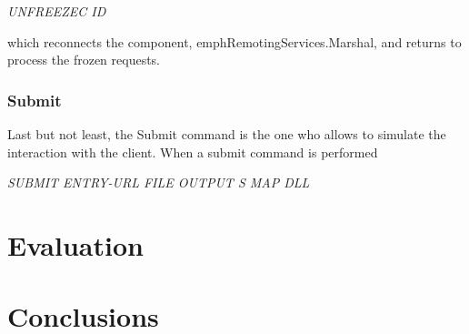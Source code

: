 \documentclass[times, 10pt,twocolumn]{article}
\begin{document}
	        \emph{UNFREEZEC ID}
	        
	        which reconnects the component, emph{RemotingServices.Marshal}, and returns to process the frozen requests.
            
            \subsubsection{Submit}   
            Last but not least, the Submit command is the one who allows to simulate the interaction with the client. When a submit command is performed
            
            \emph{SUBMIT ENTRY-URL FILE OUTPUT S MAP DLL}
            
            
	
	\section{Evaluation}
	
	\section{Conclusions}
	
	
	
\end{document}
